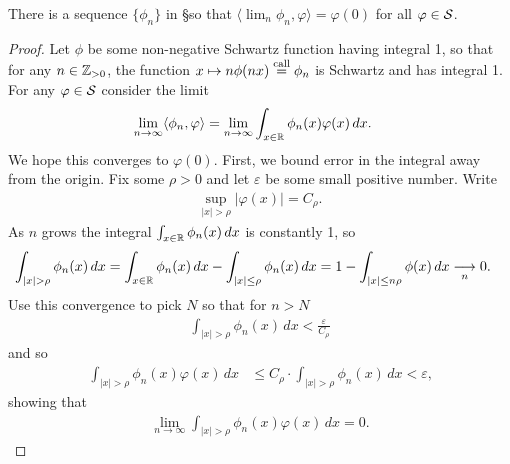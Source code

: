     \begin{thm}
      There is a sequence $\{\phi_n\}$ in \S so that $\langle\lim_n \phi_n,\varphi\rangle = \varphi(0)$ for all $\varphi\in\S$.
    \end{thm}
    \begin{proof}
      Let $\phi$ be some non-negative Schwartz function having integral 1, so that for any $n\in\Z_{>0}$, the function $x\mapsto n\phi(nx) \call \phi_n$ is Schwartz and has integral 1.
      For any $\varphi\in\S$ consider the limit
      \begin{align*}
        \lim_{n\rightarrow\infty}\langle\phi_n,\varphi\rangle 
        &=\lim_{n\rightarrow\infty}\int_{x\in\R} \phi_n(x)\varphi(x)\,dx\text{.}
      \end{align*}
      We hope this converges to $\varphi(0)$.
      First, we bound error in the integral away from the origin.
      Fix some $\rho>0$ and let $\varepsilon$ be some small positive number.
      Write
      \begin{align*}
        \sup_{|x|>\rho} |\varphi(x)| = C_\rho \text{.}
      \end{align*}
      As $n$ grows the integral $\int_{x\in\R}\phi_n(x)\,dx$ is constantly 1, so
      \begin{align*}
        \int_{|x|>\rho} \phi_n(x)\,dx
        &= \int_{x\in\R} \phi_n(x)\,dx - \int_{|x|\le \rho} \phi_n(x)\,dx
        = 1-\int_{|x|\le n\rho} \phi(x)\,dx
        \underset n\longrightarrow 0 \text{.}
      \end{align*}
      Use this convergence to pick $N$ so that for $n>N$
      \begin{align*}
        \int_{|x|>\rho} \phi_n(x)\,dx
        < \frac\varepsilon{C_\rho}
      \end{align*}
      and so
      \begin{align*}
        \int_{|x|>\rho} \phi_n(x)\varphi(x)\,dx
        &\le C_\rho \cdot \int_{|x|>\rho} \phi_n(x)\,dx
        < \varepsilon \text{,}
      \end{align*}
      showing that
      \begin{align*}
        \lim_{n\rightarrow\infty} \int_{|x|>\rho} \phi_n(x)\varphi(x)\,dx
        = 0 \text{.}
      \end{align*}


\end{proof}
